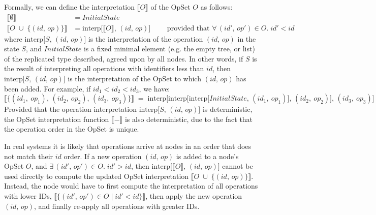 Formally, we can define the interpretation $\llbracket O \rrbracket$ of the OpSet $O$ as follows:
\begin{align*}
    \big\llbracket \emptyset \big\rrbracket &= \mathit{InitialState} \\
    \big\llbracket O \;\cup\; \{(\mathit{id},\, \mathit{op})\} \big\rrbracket &=
    \mathrm{interp}\big[\llbracket O \rrbracket,\, (\mathit{id},\, \mathit{op})\big]
    \qquad\text{ provided that } \forall\,(\mathit{id}',\, \mathit{op}') \in O.\; \mathit{id}' < \mathit{id}
\end{align*}
where $\mathrm{interp}\big[S,\, (\mathit{id},\, \mathit{op})\big]$ is the interpretation of the operation $(\mathit{id},\, \mathit{op})$ in the state $S$, and $\mathit{InitialState}$ is a fixed minimal element (e.g. the empty tree, or list) of the replicated type described, agreed upon by all nodes.
In other words, if $S$ is the result of interpreting all operations with identifiers less than $\mathit{id}$, then
$\mathrm{interp}\big[S,\, (\mathit{id},\, \mathit{op})\big]$ is the interpretation of the OpSet to which $(\mathit{id},\, \mathit{op})$ has been added.
For example, if $\mathit{id}_1 < \mathit{id}_2 < \mathit{id}_3$, we have:
\[ \big\llbracket \{(\mathit{id}_1,\ \mathit{op}_1),\,
    (\mathit{id}_2,\ \mathit{op}_2),\,
    (\mathit{id}_3,\ \mathit{op}_3)\} \big\rrbracket \;=\;
    \mathrm{interp}\big[\mathrm{interp}\big[\mathrm{interp}\big[\mathit{InitialState},\,
    (\mathit{id}_1,\ \mathit{op}_1)\big],\,
    (\mathit{id}_2,\ \mathit{op}_2)\big],\,
    (\mathit{id}_3,\ \mathit{op}_3)\big] \]
Provided that the operation interpretation $\mathrm{interp}\big[S,\, (\mathit{id},\, \mathit{op})\big]$ is deterministic, the OpSet interpretation function $\llbracket-\rrbracket$ is also deterministic, due to the fact that the operation order in the OpSet is unique.

In real systems it is likely that operations arrive at nodes in an order that does not match their $\mathit{id}$ order.
If a new operation $(\mathit{id},\, \mathit{op})$ is added to a node's OpSet $O$, and $\exists\,(\mathit{id}',\, \mathit{op}') \in O.\; \mathit{id}' > \mathit{id}$,
then $\mathrm{interp}\big[\llbracket O \rrbracket,\, (\mathit{id},\, \mathit{op})\big]$ cannot be used directly to compute the updated OpSet interpretation
$\big\llbracket O \;\cup\; \{(\mathit{id},\, \mathit{op})\} \big\rrbracket$.
Instead, the node would have to first compute the interpretation of all operations with lower IDs,
$\big\llbracket \{(\mathit{id}',\, \mathit{op}') \in O \mid \mathit{id}' < \mathit{id}\} \big\rrbracket$,
then apply the new operation $(\mathit{id},\, \mathit{op})$, and finally re-apply all operations with greater IDs.

